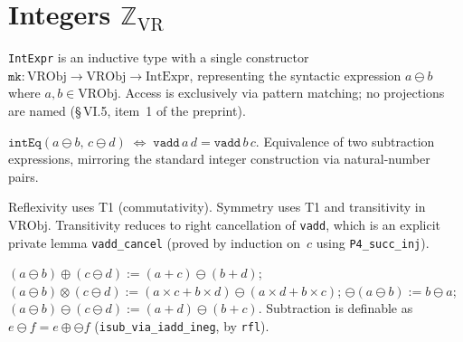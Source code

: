 \section{Integers $\mathbb{Z}_{\mathrm{VR}}$}
\label{sec:integers}

\begin{definition}
\label{def:IntExpr}
\leanok
{}
\texttt{IntExpr} is an inductive type with a single constructor
$\texttt{mk} : \mathrm{VRObj} \to \mathrm{VRObj} \to \mathrm{IntExpr}$,
representing the syntactic expression $a \ominus b$ where $a, b \in \mathrm{VRObj}$.
Access is exclusively via pattern matching; no projections are named
(\S\,VI.5, item~1 of the preprint).
\end{definition}

\begin{definition}
\label{def:intEq}
\leanok
{}
$\texttt{intEq}(a \ominus b,\, c \ominus d) \;\Longleftrightarrow\;
\texttt{vadd}\,a\,d = \texttt{vadd}\,b\,c$.
Equivalence of two subtraction expressions, mirroring the standard integer
construction via natural-number pairs.
\end{definition}

\begin{theorem}
\label{thm:intEq_equiv}
\leanok
{}
Reflexivity uses T1 (commutativity).  Symmetry uses T1 and transitivity
in $\mathrm{VRObj}$.  Transitivity reduces to right cancellation of
\texttt{vadd}, which is an explicit private lemma \texttt{vadd\_cancel}
(proved by induction on~$c$ using \texttt{P4\_succ\_inj}).
\end{theorem}

\begin{definition}
\label{def:int_ops_expr}
\leanok
{}
$(a \ominus b) \oplus (c \ominus d) := (a{+}c) \ominus (b{+}d)$;\quad
$(a \ominus b) \otimes (c \ominus d) := (a{\times}c {+} b{\times}d) \ominus
(a{\times}d {+} b{\times}c)$;\quad
$\ominus(a \ominus b) := b \ominus a$;\quad
$(a \ominus b) \ominus (c \ominus d) := (a{+}d) \ominus (b{+}c)$.
Subtraction is definable as $e \ominus f = e \oplus \ominus f$
(\texttt{isub\_via\_iadd\_ineg}, by \texttt{rfl}).
\end{definition}

